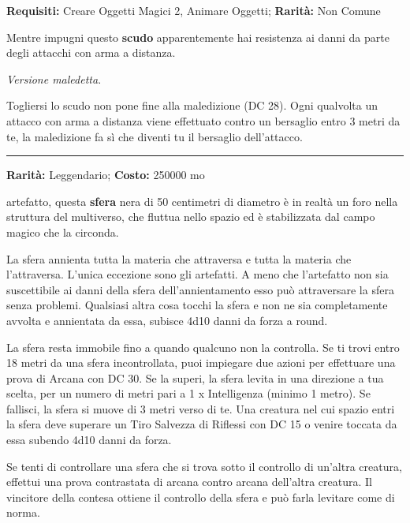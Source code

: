 \begin{multicols}{2}
\textbf{Requisiti:} Creare Oggetti Magici 2, Animare Oggetti; \textbf{Rarità:} Non Comune

Mentre impugni questo \textbf{scudo} apparentemente hai resistenza ai danni da parte degli attacchi con arma a distanza.

\emph{Versione maledetta}.

Togliersi lo scudo non pone fine alla maledizione (DC 28). Ogni qualvolta un attacco con arma a distanza viene effettuato contro un bersaglio entro 3 metri da te, la maledizione fa sì che diventi tu il bersaglio dell'attacco.

\smallskip\noindent\rule{\linewidth}{2pt}  \hypertarget{Sferadell'Annientamento}{}\medskip{}\noindent\label{Sferadell'Annientamento}

\textbf{Rarità:} Leggendario; \textbf{Costo:} 250000 mo

artefatto, questa \textbf{sfera} nera di 50 centimetri di diametro è in realtà un foro nella struttura del multiverso, che fluttua nello spazio ed è stabilizzata dal campo magico che la circonda.

La sfera annienta tutta la materia che attraversa e tutta la materia che l'attraversa. L'unica eccezione sono gli artefatti. A meno che l'artefatto non sia suscettibile ai danni della sfera dell'annientamento esso può attraversare la sfera senza problemi. Qualsiasi altra cosa tocchi la sfera e non ne sia completamente avvolta e annientata da essa, subisce 4d10 danni da forza a round.

La sfera resta immobile fino a quando qualcuno non la controlla. Se ti trovi entro 18 metri da una sfera incontrollata, puoi impiegare due azioni per effettuare una prova di Arcana con DC 30. Se la superi, la sfera levita in una direzione a tua scelta, per un numero di metri pari a 1 x Intelligenza (minimo 1 metro). Se fallisci, la sfera si muove di 3 metri verso di te. Una creatura nel cui spazio entri la sfera deve superare un Tiro Salvezza di Riflessi con DC 15 o venire toccata da essa subendo 4d10 danni da forza.

Se tenti di controllare una sfera che si trova sotto il controllo di un'altra creatura, effettui una prova contrastata di arcana contro arcana dell'altra creatura. Il vincitore della contesa ottiene il controllo della sfera e può farla levitare come di norma.



\end{multicols}
